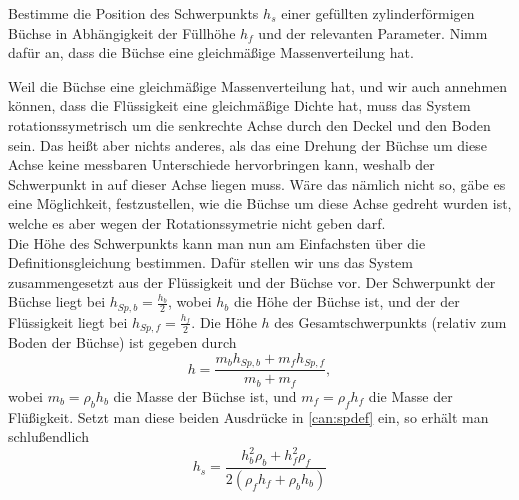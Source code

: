\begin{minipage}[b]{0.8\textwidth}
\noindent
\begin{Exercise}[label = can, title = {Büchse}, origin = {nach 3. Runde IPhO, 2011},difficulty = 1]
	Bestimme die Position des Schwerpunkts $h_s$ einer gefüllten zylinderförmigen Büchse in Abhängigkeit der Füllhöhe $h_f$ und der relevanten Parameter. Nimm dafür an, dass die Büchse eine gleichmäßige Massenverteilung hat. 
\end{Exercise}
\end{minipage}
\begin{minipage}[b]{0.2\textwidth}
\centering
{}
\end{minipage}
\begin{Answer}[ref = can]
	Weil die Büchse eine gleichmäßige Massenverteilung hat, und wir auch annehmen können, dass die Flüssigkeit eine gleichmäßige Dichte hat, muss das System rotationssymetrisch um die senkrechte Achse durch den Deckel und den Boden sein. Das heißt aber nichts anderes, als das eine Drehung der Büchse um diese Achse keine messbaren Unterschiede hervorbringen kann, weshalb der Schwerpunkt in auf dieser Achse liegen muss. Wäre das nämlich nicht so, gäbe es eine Möglichkeit, festzustellen, wie die Büchse um diese Achse gedreht wurden ist, welche es aber wegen der Rotationssymetrie nicht geben darf.\\
	Die Höhe des Schwerpunkts kann man nun am Einfachsten über die Definitionsgleichung bestimmen. Dafür stellen wir uns das System zusammengesetzt aus der Flüssigkeit und der Büchse vor. Der Schwerpunkt der Büchse liegt bei $h_{Sp,b} = \frac{h_b}{2}$, wobei $h_b$ die Höhe der Büchse ist, und der der Flüssigkeit liegt bei $h_{Sp,f}=\frac{h_f}{2}$. Die Höhe $h$ des Gesamtschwerpunkts (relativ zum Boden der Büchse) ist gegeben durch
	\begin{equation}\label{can:spdef}
		h = \frac{m_{b}h_{Sp,b}+m_{f}h_{Sp,f}}{m_{b}+m_{f}},
	\end{equation}
	wobei $m_b = \rho_b h_b$ die Masse der Büchse ist, und $m_f = \rho_f h_f$ die Masse der Flüßigkeit. Setzt man diese beiden Ausdrücke in \eqref{can:spdef} ein, so erhält man schlußendlich
	\begin{equation*}
		\boxed{
			h_s = \frac{h_b^2 \rho_b + h_f^2 \rho_f}{2\left(\rho_f h_f + \rho_b h_b\right)}
			}
	\end{equation*}
\end{Answer}
